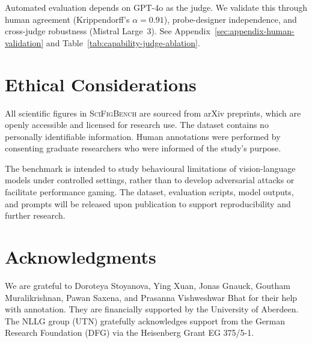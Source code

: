 Automated evaluation depends on GPT-4o as the judge. We validate this through human agreement (Krippendorff's $\alpha = 0.91$), probe-designer independence, and cross-judge robustness (Mistral Large~3). See Appendix~\ref{sec:appendix-human-validation} and Table~\ref{tab:capability-judge-ablation}.

\section*{Ethical Considerations}

All scientific figures in \textsc{SciFigBench} are sourced from arXiv preprints, which are openly accessible and licensed for research use. The dataset contains no personally identifiable information. Human annotations were performed by consenting graduate researchers who were informed of the study's purpose. %

The benchmark is intended to study behavioural limitations of vision-language models under controlled settings, rather than to develop adversarial attacks or facilitate performance gaming. The dataset, evaluation scripts, model outputs, and prompts will be released upon publication to support reproducibility and further research.

\section*{Acknowledgments}
We are grateful to Doroteya Stoyanova, Ying Xuan, Jonas Gnauck, Goutham Muralikrishnan, Pawan Saxena, and Prasanna Vishweshwar Bhat for their help with annotation. They are financially supported by the University of Aberdeen. The NLLG group (UTN) gratefully acknowledges support
from the German Research Foundation (DFG) via
the Heisenberg Grant EG 375/5-1.
